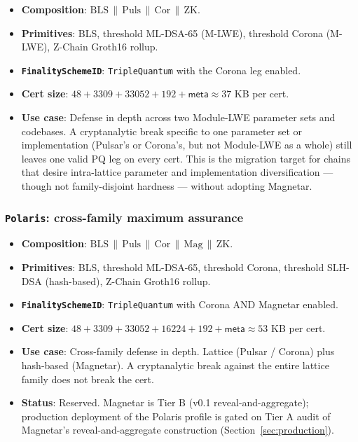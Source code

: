 \begin{itemize}[leftmargin=2em,nosep]
\item \textbf{Composition}: $\mathrm{BLS} \,\|\, \mathrm{Puls} \,\|\,
      \mathrm{Cor} \,\|\, \mathrm{ZK}$.
\item \textbf{Primitives}: BLS, threshold ML-DSA-65 (M-LWE), threshold
      Corona (M-LWE), Z-Chain Groth16 rollup.
\item \textbf{\texttt{FinalitySchemeID}}: \texttt{TripleQuantum} with
      the Corona leg enabled.
\item \textbf{Cert size}: $48 + 3309 + 33052 + 192 + \mathsf{meta}
      \approx 37$ KB per cert.
\item \textbf{Use case}: Defense in depth across two Module-LWE
      parameter sets and codebases. A cryptanalytic break specific
      to one parameter set or implementation (Pulsar's or Corona's,
      but not Module-LWE as a whole) still leaves one valid PQ leg
      on every cert. This is the migration target for chains that
      desire intra-lattice parameter and implementation
      diversification --- though not family-disjoint hardness ---
      without adopting Magnetar.
\end{itemize}

\subsubsection*{\texttt{Polaris}: cross-family maximum assurance}

\begin{itemize}[leftmargin=2em,nosep]
\item \textbf{Composition}: $\mathrm{BLS} \,\|\, \mathrm{Puls} \,\|\,
      \mathrm{Cor} \,\|\, \mathrm{Mag} \,\|\, \mathrm{ZK}$.
\item \textbf{Primitives}: BLS, threshold ML-DSA-65, threshold Corona,
      threshold SLH-DSA (hash-based), Z-Chain Groth16 rollup.
\item \textbf{\texttt{FinalitySchemeID}}: \texttt{TripleQuantum} with
      Corona AND Magnetar enabled.
\item \textbf{Cert size}: $48 + 3309 + 33052 + 16224 + 192 + \mathsf{meta}
      \approx 53$ KB per cert.
\item \textbf{Use case}: Cross-family defense in depth. Lattice
      (Pulsar / Corona) plus hash-based (Magnetar). A cryptanalytic
      break against the entire lattice family does not break the cert.
\item \textbf{Status}: Reserved. Magnetar is Tier B (v0.1 reveal-and-aggregate);
      production deployment of the Polaris profile is gated on Tier A
      audit of Magnetar's reveal-and-aggregate construction
      (Section~\ref{sec:production}).
\end{itemize}

